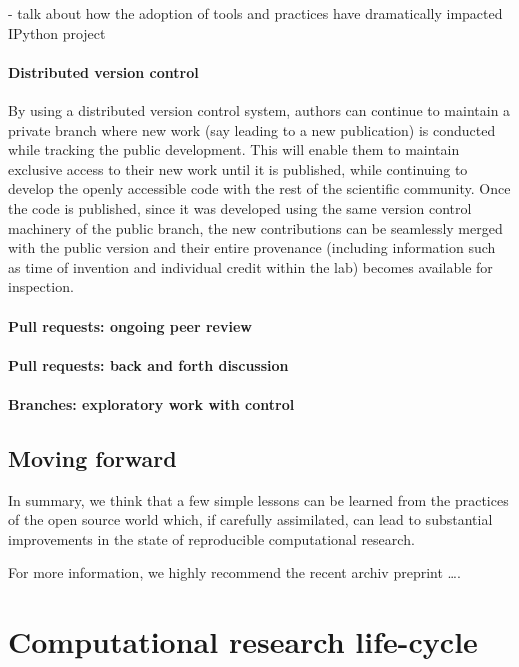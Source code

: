 \documentclass[ChapterTOCs,krantz2]{krantz} %
\begin{document}
- talk about how the adoption of tools and practices have dramatically
impacted IPython project

\paragraph{ {\bf Distributed version control}}

By using a distributed version control system, authors can continue
to maintain a private branch where new work (say leading to a new
publication) is conducted while tracking the public development. This
will enable them to maintain exclusive access to their new work until
it is published, while continuing to develop the openly accessible
code with the rest of the scientific community. Once the code is published,
since it was developed using the same version control machinery of
the public branch, the new contributions can be seamlessly merged
with the public version and their entire provenance (including information
such as time of invention and individual credit within the lab) becomes
available for inspection.

\paragraph{ {\bf Pull requests: ongoing peer review}}

\paragraph{ {\bf Pull requests: back and forth discussion}}

\paragraph{ {\bf Branches: exploratory work with control}}


\subsection{Moving forward }

In summary, we think that a few simple lessons can be learned from
the practices of the open source world which, if carefully assimilated,
can lead to substantial improvements in the state of reproducible
computational research. 

For more information, we highly recommend the recent archiv preprint
\ldots \cite{2012arXiv1210.0530A}.

\section{\label{sec:life-cycle}Computational research life-cycle}
\end{document}
